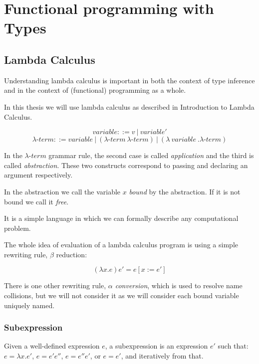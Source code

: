 \chapter{Functional programming with Types}

\section{Lambda Calculus}

Understanding lambda calculus is important in both the context of type inference and in the context of (functional) programming as a whole.

In this thesis we will use lambda calculus as described in Introduction to Lambda Calculus.

\begin{defn}
$$variable ::= v\ |\ variable'$$
$$\lambda\mbox{-}term ::= variable\ |\ (\lambda\mbox{-}term\ \lambda\mbox{-}term)\ |\ (\lambda\ variable\ . \lambda\mbox{-}term )$$
\end{defn}

In the $\lambda\mbox{-}term$ grammar rule, the second case is called \emph{application} and the third is called \emph{abstraction}. These two constructs correspond to passing and declaring an argument respectively.

In the abstraction we call the variable $x$ \emph{bound} by the abstraction. If it is not bound we call it \emph{free}.

It is a simple language in which we can formally describe any computational problem.

The whole idea of evaluation of a lambda calculus program is using a simple rewriting rule, $\beta$ reduction:

\begin{defn}
    $$(\lambda x . e) e' = e [x := e']$$ \cite{barendregt1992lambda}
\end{defn}

There is one other rewriting rule, \emph{$\alpha$ conversion}, which is used to resolve name collisions, but we will not consider it as we will consider each bound variable uniquely named.

\subsection{Subexpression}

\begin{defn}[Subexpression]
Given a well-defined expression $e$, a subexpression is an expression $e'$ such that: $e = \lambda x . e'$, $e = e' e''$, $e = e'' e'$, or $e = e'$, and iteratively from that.
\end{defn}

